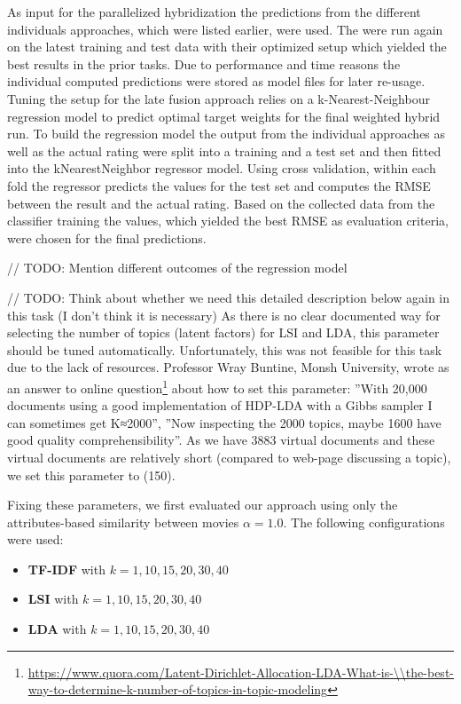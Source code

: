 \documentclass{sigish}
\begin{document}
As input for the parallelized hybridization the predictions from the different individuals approaches, which were listed earlier, were used. The were run again on the latest training and test data with their optimized setup which yielded the best results in the prior tasks.    Due to performance and time reasons the individual computed predictions were stored as model files for later re-usage. Tuning the setup for the late fusion approach relies on a k-Nearest-Neighbour regression model to predict optimal target weights for the final weighted hybrid run. To build the regression model the output from the individual approaches as well as the actual rating were split into a training and a test set and then fitted into the kNearestNeighbor regressor model. Using cross validation, within each fold the regressor predicts the values for the test set and computes the RMSE between the result and the actual rating. Based on the collected data from the classifier training the values, which yielded the best RMSE as evaluation criteria, were chosen for the final predictions. 

// TODO: Mention different outcomes of the regression model

// TODO: Think about whether we need this detailed description below again in this task (I don't think it is necessary)
As there is no clear documented way for selecting the number of topics (latent factors) for LSI and LDA, this parameter should be tuned automatically. Unfortunately, this was not feasible for this task due to the lack of resources. Professor Wray Buntine, Monsh University, wrote as an answer to online question\footnote{\url{https://www.quora.com/Latent-Dirichlet-Allocation-LDA-What-is-\\the-best-way-to-determine-k-number-of-topics-in-topic-modeling}} about how to set this parameter: ''With 20,000 documents using a good implementation of HDP-LDA with a Gibbs sampler I can sometimes get  K≈2000'', ''Now inspecting the 2000 topics, maybe 1600 have good quality comprehensibility''. As we have 3883 virtual documents and these virtual documents are relatively short (compared to web-page discussing a topic), we set this parameter to (150).

Fixing these parameters, we first evaluated our approach using only the attributes-based similarity between movies $ \alpha=1.0 $. The following configurations were used:
\begin{itemize}
\item \textbf{TF-IDF} with $ k = {1, 10, 15, 20, 30, 40} $
\item \textbf{LSI} with $ k = {1, 10, 15, 20, 30, 40} $
\item \textbf{LDA} with $ k = {1, 10, 15, 20, 30, 40} $
\end{itemize}
\end{document}
